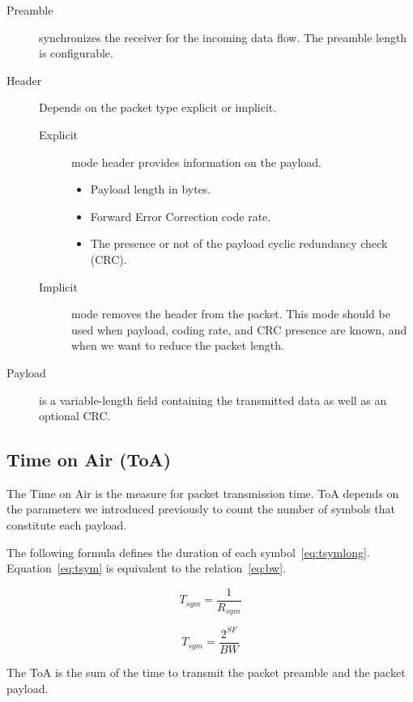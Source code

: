 \begin{description}
  \item[Preamble] synchronizes the receiver for the incoming data flow. The
    preamble length is configurable.
  \item[Header] Depends on the packet type explicit or implicit.
  \begin{description}
    \item[Explicit] mode header provides information on the payload.
    \begin{itemize}
      \item Payload length in bytes.
      \item Forward Error Correction code rate.
      \item The presence or not of the payload cyclic redundancy check (CRC).
    \end{itemize}
    \item[Implicit] mode removes the header from the packet. This mode should be
      used when payload, coding rate, and CRC presence are known, and when we want to
      reduce the packet length.
  \end{description}
  \item[Payload] is a variable-length field containing the transmitted data as
    well as an optional CRC.
\end{description}

\subsection{Time on Air (ToA)}

The Time on Air is the measure for packet transmission time.
ToA depends on the parameters we introduced previously to count the number of
symbols that constitute each payload.

The following formula defines the duration of each symbol~\ref{eq:tsymlong}.
Equation~\ref{eq:tsym} is equivalent to the relation~\ref{eq:bw}.

\begin{equation}
  \label{eq:tsymlong}
  T_{sym} = \frac{1}{R_{sym}}
\end{equation}

\begin{equation}
  \label{eq:tsym}
  T_{sym} = \frac{2^{SF}}{BW}
\end{equation}

The ToA is the sum of the time to transmit the packet preamble and the packet
payload.

